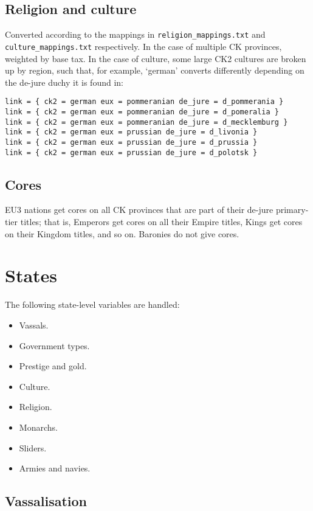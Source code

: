 \documentclass[12pt,ebook,oneside]{book}
\begin{document}
\section{Religion and culture}

\label{sec:provculture}

Converted according to the mappings in \verb|religion_mappings.txt|
and \verb|culture_mappings.txt| respectively. In the case of multiple
CK provinces, weighted by base tax. In the case of culture, some large
CK2 cultures are broken up by region, such that, for example, `german'
converts differently depending on the de-jure duchy it is found in:
\begin{verbatim}
link = { ck2 = german eux = pommeranian de_jure = d_pommerania }
link = { ck2 = german eux = pommeranian de_jure = d_pomeralia }
link = { ck2 = german eux = pommeranian de_jure = d_mecklemburg }
link = { ck2 = german eux = prussian de_jure = d_livonia }
link = { ck2 = german eux = prussian de_jure = d_prussia }
link = { ck2 = german eux = prussian de_jure = d_polotsk }
\end{verbatim} 

\section{Cores}

EU3 nations get cores on all CK provinces that are part of their
de-jure primary-tier titles; that is, Emperors get cores on all their
Empire titles, Kings get cores on their Kingdom titles, and so
on. Baronies do not give cores. 

\chapter{States}

The following state-level variables are handled:
\begin{itemize}
\item Vassals.
\item Government types. 
\item Prestige and gold. 
\item Culture. 
\item Religion. 
\item Monarchs. 
\item Sliders.
\item Armies and navies. 
\end{itemize}

\section{Vassalisation}
\end{document}
